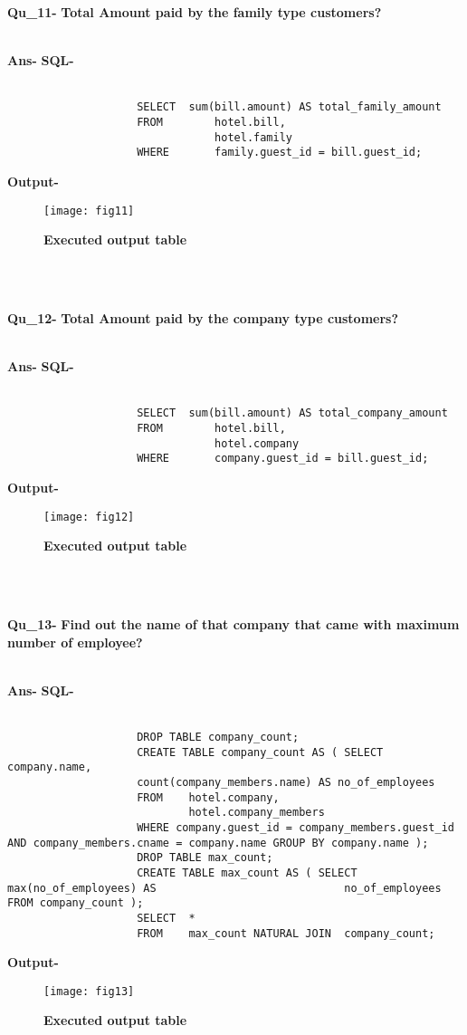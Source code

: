 \documentclass[a4,12pt]{report}
\begin{document}
\newpage
\textbf{Qu\_11-}  \textbf{Total Amount paid by the family type customers?} \\\

\textbf{Ans-}		\textbf{SQL-} \\\
\begin{lstlisting}
					SELECT 	sum(bill.amount) AS total_family_amount
					FROM		hotel.bill, 
								hotel.family
					WHERE		family.guest_id = bill.guest_id;
\end{lstlisting}
\textbf{Output-} \\			   
\begin{figure}[hbtp]
\centering
\texttt{[image: fig11]}
\caption{\textbf{{\color{red}Executed output table}}}
\end{figure}
\\\

\textbf{Qu\_12-}  \textbf{Total Amount paid by the company type customers?} \\\

\textbf{Ans-}		\textbf{SQL-} \\\
\begin{lstlisting}
					SELECT 	sum(bill.amount) AS total_company_amount
					FROM		hotel.bill, 
								hotel.company
					WHERE		company.guest_id = bill.guest_id;
\end{lstlisting}
\textbf{Output-} \\			   
\begin{figure}[hbtp]
\centering
\texttt{[image: fig12]}
\caption{\textbf{{\color{red}Executed output table}}}
\end{figure}
\\\

\newpage
\textbf{Qu\_13-}  \textbf{Find out the name of that company that came with maximum number of employee?} \\\

\textbf{Ans-}		\textbf{SQL-} \\\
\begin{lstlisting}
					DROP TABLE company_count;
					CREATE TABLE company_count AS ( SELECT	company.name, 
					count(company_members.name) AS no_of_employees
					FROM	hotel.company, 
							hotel.company_members
					WHERE company.guest_id = company_members.guest_id AND company_members.cname = company.name GROUP BY	company.name );
					DROP TABLE max_count;
					CREATE TABLE max_count AS ( SELECT	max(no_of_employees) AS 							no_of_employees FROM company_count );
					SELECT  *
					FROM	max_count NATURAL JOIN	company_count;
\end{lstlisting}
\textbf{Output-} \\			   
\begin{figure}[hbtp]
\centering
\texttt{[image: fig13]}
\caption{\textbf{{\color{red}Executed output table}}}
\end{figure}
\\\
\end{document}
